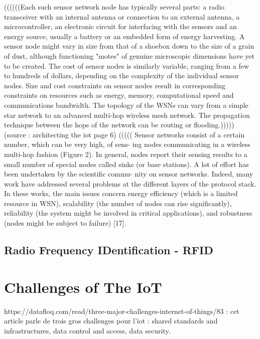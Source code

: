 ((((((Each such sensor network node has typically several parts: a radio transceiver with an internal antenna or connection to an external antenna, a microcontroller, an electronic circuit for interfacing with the sensors and an energy source, usually a battery or an embedded form of energy harvesting. A sensor node might vary in size from that of a shoebox down to the size of a grain of dust, although functioning "motes" of genuine microscopic dimensions have yet to be created. The cost of sensor nodes is similarly variable, ranging from a few to hundreds of dollars, depending on the complexity of the individual sensor nodes. Size and cost constraints on sensor nodes result in corresponding constraints on resources such as energy, memory, computational speed and communications bandwidth. The topology of the WSNs can vary from a simple star network to an advanced multi-hop wireless mesh network. The propagation technique between the hops of the network can be routing or flooding.)))))\\

(source : architecting the iot page 6)
(((((
Sensor networks consist of a certain number, which can be very high, of sens- ing nodes communicating in a wireless multi-hop fashion (Figure 2). In general, nodes report their sensing results to a small number of special nodes called sinks (or base stations). A lot of effort has been undertaken by the scientific commu- nity on sensor networks. Indeed, many work have addressed several problems at the different layers of the protocol stack. In these works, the main issues concern energy efficiency (which is a limited resource in WSN), scalability (the number of nodes can rise significantly), reliability (the system might be involved in critical applications), and robustness (nodes might be subject to failure) [17].

\subsection{Radio Frequency IDentification - RFID}


\section{Challenges of The IoT}

https://datafloq.com/read/three-major-challenges-internet-of-things/83 : cet article parle de trois gros challenges pour l'iot : shared standards and infrastructures, data control and access, data security.\\

